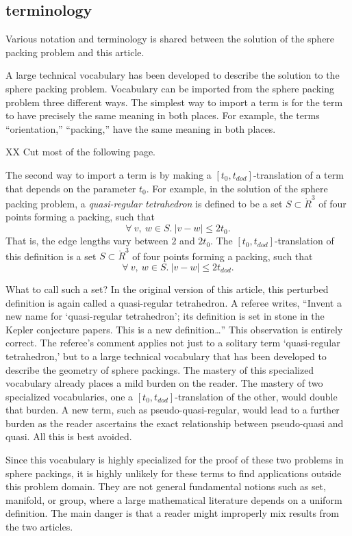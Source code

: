 \subsection{terminology}

Various notation and terminology is shared between the solution
of the sphere packing problem and this article.  

A large technical vocabulary has been developed 
to describe the solution to the sphere packing problem.  
Vocabulary can be imported from the sphere packing problem three
different ways.  The simplest way to import a term is for the
term to have precisely the same meaning in both places.  For
example, the terms ``orientation,'' ``packing,'' have the
same meaning in both places. 

XX Cut most of the following page.

The second way to import a term is by making a $[t_0,t_{dod}]$-translation of a term that depends on the parameter $t_0$.  For example,
in the solution of the sphere packing problem, a {\it quasi-regular
tetrahedron} is defined to be a set $S\subset\ring{R}^3$ of four
points forming a packing, such that
   $$
   \forall\ v,\ w \in S.\ |v - w| \le 2t_0.
   $$
That is, the edge lengths vary between $2$ and $2t_0$.
The $[t_0,t_{dod}]$-translation of this definition is a set $S\subset\ring{R}^3$
of four points forming a packing, such that
   $$
   \forall\ v,\ w \in S.\ |v - w| \le 2t_{dod}.
   $$

What to call such a set?  In the original version of this article,
this perturbed definition is again called a quasi-regular tetrahedron. 
A referee writes, ``Invent a new name
for `quasi-regular tetrahedron'; its definition is set in stone
in the Kepler conjecture papers.  This is a new definition\ldots'' 
This observation is entirely correct.  The referee's comment applies not
just to a solitary term `quasi-regular tetrahedron,' but to
a large technical vocabulary that has been developed to describe
the geometry of sphere packings.  The mastery of this specialized
vocabulary already places a mild burden on the reader.  The mastery
of two specialized vocabularies, one a $[t_0,t_{dod}]$-translation
of the other, would double that burden.  A new term,
such as pseudo-quasi-regular, would lead to a further burden
as the reader ascertains the exact relationship between
pseudo-quasi and quasi.  All this is best avoided.

Since this vocabulary is highly specialized for the proof of these
two problems in sphere packings, it is highly unlikely for these terms to find applications outside this problem domain.  They are not 
general fundamental notions such as set, manifold, or group, where
a large mathematical literature depends on a uniform definition.
The main danger is that a reader might improperly mix results from the
two articles.


